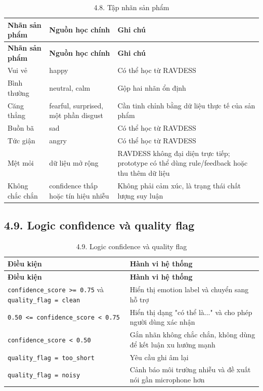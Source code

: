 \documentclass[12pt,a4paper]{article}
\begin{document}
\begin{center}
\begin{longtable}{|P{0.25\textwidth}|P{0.32\textwidth}|P{0.33\textwidth}|}
\caption{4.8. Tập nhãn sản phẩm}\\
\hline
\textbf{Nhãn sản phẩm} & \textbf{Nguồn học chính} & \textbf{Ghi chú} \\
\hline
\endfirsthead
\hline
\textbf{Nhãn sản phẩm} & \textbf{Nguồn học chính} & \textbf{Ghi chú} \\
\hline
\endhead
Vui vẻ & happy & Có thể học từ RAVDESS \\
\hline
Bình thường & neutral, calm & Gộp hai nhãn ổn định \\
\hline
Căng thẳng & fearful, surprised, một phần disgust & Cần tinh chỉnh bằng dữ liệu thực tế của sản phẩm \\
\hline
Buồn bã & sad & Có thể học từ RAVDESS \\
\hline
Tức giận & angry & Có thể học từ RAVDESS \\
\hline
Mệt mỏi & dữ liệu mở rộng & RAVDESS không đại diện trực tiếp; prototype có thể dùng rule/feedback hoặc thu thêm dữ liệu \\
\hline
Không chắc chắn & confidence thấp hoặc tín hiệu nhiễu & Không phải cảm xúc, là trạng thái chất lượng suy luận \\
\hline
\end{longtable}
\end{center}

\subsection*{4.9. Logic confidence và quality flag}

\begin{center}
\begin{longtable}{|P{0.30\textwidth}|P{0.62\textwidth}|}
\caption{4.9. Logic confidence và quality flag}\\
\hline
\textbf{Điều kiện} & \textbf{Hành vi hệ thống} \\
\hline
\endfirsthead
\hline
\textbf{Điều kiện} & \textbf{Hành vi hệ thống} \\
\hline
\endhead
\texttt{confidence\_score >= 0.75} và \texttt{quality\_flag = clean} & Hiển thị emotion label và chuyển sang hỗ trợ \\
\hline
\texttt{0.50 <= confidence\_score < 0.75} & Hiển thị dạng "có thể là..." và cho phép người dùng xác nhận \\
\hline
\texttt{confidence\_score < 0.50} & Gắn nhãn không chắc chắn, không dùng để kết luận xu hướng mạnh \\
\hline
\texttt{quality\_flag = too\_short} & Yêu cầu ghi âm lại \\
\hline
\texttt{quality\_flag = noisy} & Cảnh báo môi trường nhiễu và đề xuất nói gần microphone hơn \\
\hline
\end{longtable}
\end{center}
\end{document}
